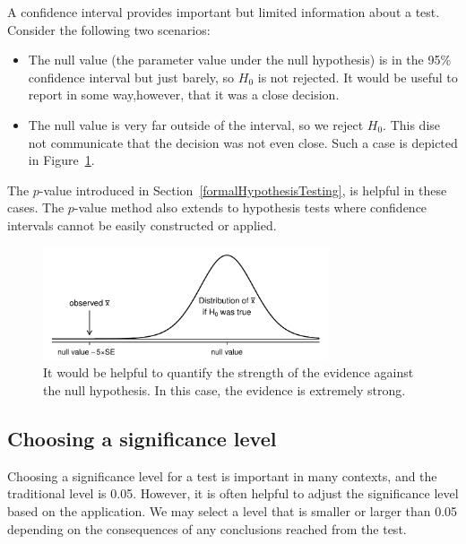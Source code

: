 \begin{spacing}{1.5}
A confidence interval provides important but limited information about a test.  Consider the following two scenarios:
\begin{itemize}
\setlength{\itemsep}{0mm}
\item The null value (the parameter value under the null hypothesis) is in the 95\% confidence interval but just barely, so $H_0$ is not rejected. It would be useful to report in some way,however, that it was a close decision.
\item The null value is very far outside of the interval, so we reject $H_0$. This dise not communicate that the decision was not even close. Such a case is depicted in Figure~\ref{whyWeWantPValue}.
\end{itemize}
The $p$-value introduced in Section~\ref{formalHypothesisTesting}, is helpful in these cases. The $p$-value method also extends to hypothesis tests where confidence intervals cannot be easily constructed or applied.

\begin{figure}[hht]
\centering
\includegraphics[width=0.75\textwidth]
{ch_inference_foundations_oi_biostat/figures/whyWeWantPValue/whyWeWantPValue}
\caption{It would be helpful to quantify the strength of the evidence against the null hypothesis. In this case, the evidence is extremely strong.}
\label{whyWeWantPValue}
\end{figure}



\subsection{Choosing a significance level}
\label{significanceLevel}


Choosing a significance level for a test is important in many contexts, and the traditional level is 0.05. However, it is often helpful to adjust the significance level based on the application. We may select a level that is smaller or larger than 0.05 depending on the consequences of any conclusions reached from the test.


\end{spacing}
